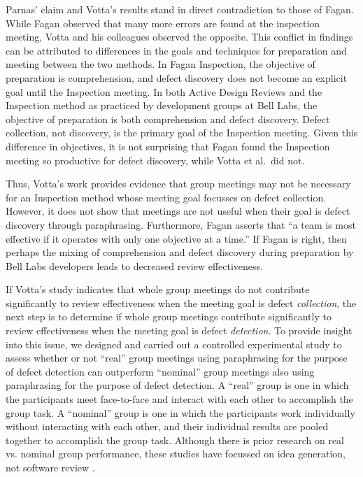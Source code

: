 Parnas' claim and Votta's results stand in direct contradiction to those of
Fagan.  While Fagan observed that many more errors are found at the
inspection meeting, Votta and his colleagues observed the opposite. 
This conflict in findings can be attributed to differences in the goals
and techniques for preparation and meeting between the two methods.  In
Fagan Inspection, the objective of preparation is comprehension, and defect
discovery does not become an explicit goal until the Inspection meeting. In
both Active Design Reviews and the Inspection method as practiced by development
groups at Bell Labs, the objective of preparation is both comprehension and
defect discovery. Defect collection, not discovery, is the primary goal
of the Inspection meeting.  Given this difference in objectives, it is not
surprising that Fagan found the Inspection meeting so productive for defect
discovery, while Votta et al.~did not.

Thus, Votta's work provides evidence that group meetings may not be
necessary for an Inspection method whose meeting goal focusses on defect
collection. However, it does not show that meetings are not useful when
their goal is defect discovery through paraphrasing. Furthermore, Fagan
asserts that ``a team is most effective if it operates with only one
objective at a time.''  If Fagan is right, then perhaps the mixing of
comprehension and defect discovery during preparation by Bell Labs
developers leads to decreased review effectiveness.

If Votta's study indicates that whole group meetings do not contribute
significantly to review effectiveness when the meeting goal is defect {\em
  collection}, the next step is to determine if whole group meetings
contribute significantly to review effectiveness when the meeting goal is
defect {\em detection}.  To provide insight into this issue, we designed
and carried out a controlled experimental study to assess whether or not
``real'' group meetings using paraphrasing for the purpose of defect
detection can outperform ``nominal'' group meetings also using paraphrasing
for the purpose of defect detection.  A ``real'' group is one in which the
participants meet face-to-face and interact with each other to accomplish
the group task. A ``nominal'' group is one in which the participants work
individually without interacting with each other, and their individual
results are pooled together to accomplish the group task.  Although there
is prior research on real vs. nominal group performance, these studies have
focussed on idea generation, not software review \cite{Diehl87,Mullen91}.

